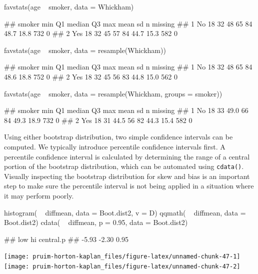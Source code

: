 \begin{Schunk}
\begin{Sinput}
favstats(age ~ smoker, data = Whickham)
\end{Sinput}
\begin{Soutput}
##   smoker min Q1 median Q3 max mean   sd   n missing
## 1     No  18 32     48 65  84 48.7 18.8 732       0
## 2    Yes  18 32     45 57  84 44.7 15.3 582       0
\end{Soutput}
\begin{Sinput}
favstats(age ~ smoker, data = resample(Whickham))
\end{Sinput}
\begin{Soutput}
##   smoker min Q1 median Q3 max mean   sd   n missing
## 1     No  18 32     48 65  84 48.6 18.8 752       0
## 2    Yes  18 32     45 56  83 44.8 15.0 562       0
\end{Soutput}
\begin{Sinput}
favstats(age ~ smoker, data = resample(Whickham, groups = smoker))
\end{Sinput}
\begin{Soutput}
##   smoker min Q1 median Q3 max mean   sd   n missing
## 1     No  18 33   49.0 66  84 49.3 18.9 732       0
## 2    Yes  18 31   44.5 56  82 44.3 15.4 582       0
\end{Soutput}
\end{Schunk}

Using either bootstrap distribution, two simple confidence intervals can
be computed. We typically introduce percentile confidence intervals
first. A percentile confidence interval is calculated by determining the
range of a central portion of the bootstrap distribution, which can be
automated using \texttt{cdata()}. Visually inspecting the bootstrap
distribution for skew and bias is an important step to make sure the
percentile interval is not being applied in a situation where it may
perform poorly.

\begin{Schunk}
\begin{Sinput}
histogram( ~ diffmean, data = Boot.dist2, v = D)
qqmath( ~ diffmean, data = Boot.dist2)
cdata( ~ diffmean, p = 0.95, data = Boot.dist2)
\end{Sinput}
\begin{Soutput}
##       low        hi central.p 
##     -5.93     -2.30      0.95
\end{Soutput}


\begin{center}\texttt{[image: pruim-horton-kaplan\_files/figure-latex/unnamed-chunk-47-1]} \texttt{[image: pruim-horton-kaplan\_files/figure-latex/unnamed-chunk-47-2]} \end{center}

\end{Schunk}

